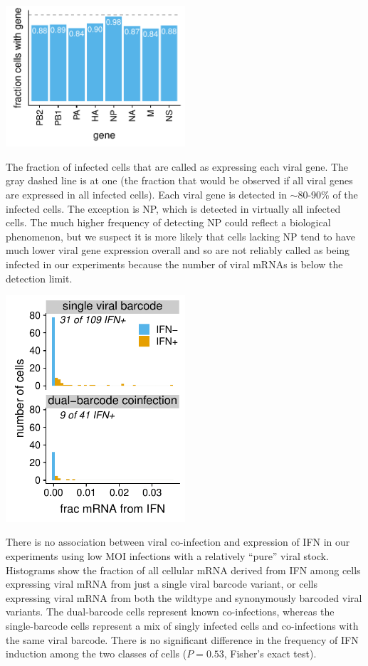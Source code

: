\documentclass[]{asm-article}
\begin{document}
\begin{suppfig}
\includegraphics[width=0.5\textwidth]{figures/single_cell_figures/p_frac_has_gene.pdf}
\caption{
The fraction of infected cells that are called as expressing each viral gene.
The gray dashed line is at one (the fraction that would be observed if all viral genes are expressed in all infected cells).
Each viral gene is detected in $\sim$80-90\% of the infected cells.
The exception is NP, which is detected in virtually all infected cells.
The much higher frequency of detecting NP could reflect a biological phenomenon, but we suspect it is more likely that cells lacking NP tend to have much lower viral gene expression overall and so are not reliably called as being infected in our experiments because the number of viral mRNAs is below the detection limit.}
\label{suppfig:frac_has_gene}
\end{suppfig}

\begin{suppfig}
\includegraphics[width=0.5\textwidth]{figures/single_cell_figures/p_frac_ifn_coinfect.pdf}
\caption{
There is no association between viral co-infection and expression of IFN in our experiments using low MOI infections with a relatively ``pure'' viral stock.
Histograms show the fraction of all cellular mRNA derived from IFN among cells expressing viral mRNA from just a single viral barcode variant, or cells expressing viral mRNA from both the wildtype and synonymously barcoded viral variants.
The dual-barcode cells represent known co-infections, whereas the single-barcode cells represent a mix of singly infected cells and co-infections with the same viral barcode.
There is no significant difference in the frequency of IFN induction among the two classes of cells ($P = 0.53$, Fisher's exact test). 
}
\label{suppfig:coinf_IFN}
\end{suppfig}
\end{document}
